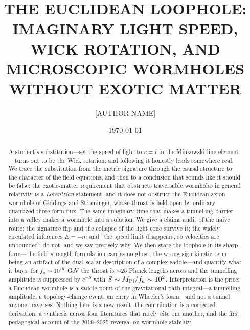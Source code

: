 \documentclass[twocolumn,floatfix,aps,prd,nofootinbib]{revtex4-2}
\begin{document}
\title{\texorpdfstring{\MakeTextUppercase{The Euclidean Loophole: Imaginary Light Speed, Wick Rotation, and Microscopic Wormholes Without Exotic Matter}}{The Euclidean Loophole: Imaginary Light Speed, Wick Rotation, and Microscopic Wormholes Without Exotic Matter}}

\author{\MakeTextUppercase{[Author Name]}}
\affiliation{\textit{[Affiliation]}}
\date{\today}

\begin{abstract}
A student's substitution---set the speed of light to $c=i$ in the Minkowski line element---turns out to be the Wick rotation, and following it honestly leads somewhere real. We trace the substitution from the metric signature through the causal structure to the character of the field equations, and then to a conclusion that sounds like it should be false: the exotic-matter requirement that obstructs traversable wormholes in general relativity is a \emph{Lorentzian} statement, and it does not obstruct the Euclidean axion wormhole of Giddings and Strominger, whose throat is held open by ordinary quantized three-form flux. The same imaginary time that makes a tunnelling barrier into a valley makes a wormhole into a solution. We give a claims audit of the naive route: the signature flip and the collapse of the light cone survive it; the widely circulated inferences $E=-m$ and ``the speed limit disappears, so velocities are unbounded'' do not, and we say precisely why. We then state the loophole in its sharp form---the field-strength formulation carries no ghost, the wrong-sign kinetic term being an artifact of the dual scalar description of a complex saddle---and quantify what it buys: for $f_a\sim10^{16}$~GeV the throat is ${\sim}25$ Planck lengths across and the tunnelling amplitude is suppressed by $e^{-S}$ with $S\sim M_{\rm Pl}/f_a\sim10^2$. Interpretation is the price: a Euclidean wormhole is a saddle point of the gravitational path integral---a tunnelling amplitude, a topology-change event, an entry in Wheeler's foam---and not a tunnel anyone traverses. Nothing here is a new result; the contribution is a corrected derivation, a synthesis across four literatures that rarely cite one another, and the first pedagogical account of the 2019--2025 reversal on wormhole stability.
\end{abstract}

\maketitle
\end{document}
